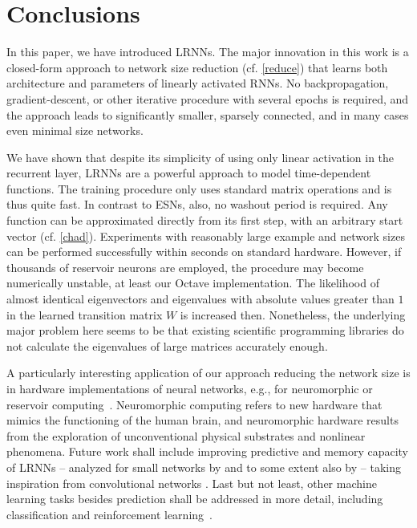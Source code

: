 \documentclass[twoside,11pt]{article}
\theoremstyle{definition}
\begin{document}
\section{Conclusions}\label{conclude}

In this paper, we have introduced LRNNs. The major innovation in this work is a
closed-form approach to network size reduction (cf.
\cref{reduce}) that learns both architecture and parameters of linearly activated RNNs.
No backpropagation, gradient-descent, or other iterative procedure with several
epochs is required, and the approach leads to significantly smaller, sparsely
connected, and in many cases even minimal size networks.

We have shown that despite its simplicity of using only linear activation in the
recurrent layer, LRNNs are a powerful approach to model time-dependent functions.
The training procedure only uses standard matrix operations and is thus quite fast.
In contrast to ESNs, also, no washout period is required. Any
function can be approximated directly from its first step, with an arbitrary
start vector (cf. \cref{chad}).
Experiments with reasonably large example and network sizes can be performed
successfully within seconds on standard hardware.
However, if thousands of reservoir neurons are employed, the procedure may
become numerically unstable, at least our Octave implementation. The likelihood
of almost identical eigenvectors and eigenvalues with absolute values greater
than $1$ in the learned transition matrix $W$ is increased then. Nonetheless,
the underlying major problem here seems to be that existing scientific
programming libraries do not calculate the eigenvalues of large matrices
accurately enough.

A particularly interesting application of our approach reducing the network size
is in hardware implementations of neural networks, e.g., for neuromorphic or
reservoir computing~\citep{Mea90,IL+11,LL17}. Neuromorphic computing refers to
new hardware that mimics the functioning of the human brain, and neuromorphic
hardware results from the exploration of unconventional physical substrates
and nonlinear phenomena. Future work shall include improving predictive and
memory capacity of LRNNs -- analyzed for small networks by \citet{Mar17} and to
some extent also by \citet{CW+16} -- taking inspiration from convolutional
networks \citep{GBC16}. Last but not least, other machine learning tasks besides
prediction shall be addressed in more detail, including classification and
reinforcement learning~\citep{SB18,PGL17}.
\end{document}
